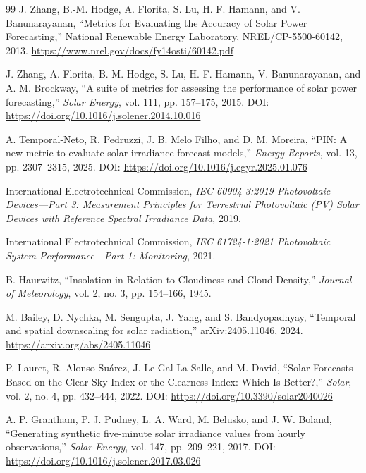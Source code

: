 \documentclass[12pt,a4paper]{article}
\begin{document}
\begin{thebibliography}{99}
J. Zhang, B.-M. Hodge, A. Florita, S. Lu, H. F. Hamann, and V. Banunarayanan,
``Metrics for Evaluating the Accuracy of Solar Power Forecasting,''
National Renewable Energy Laboratory, NREL/CP-5500-60142, 2013.
\url{https://www.nrel.gov/docs/fy14osti/60142.pdf}

J. Zhang, A. Florita, B.-M. Hodge, S. Lu, H. F. Hamann, V. Banunarayanan, and A. M. Brockway,
``A suite of metrics for assessing the performance of solar power forecasting,''
\textit{Solar Energy}, vol. 111, pp. 157--175, 2015.
DOI: \url{https://doi.org/10.1016/j.solener.2014.10.016}

A. Temporal-Neto, R. Pedruzzi, J. B. Melo Filho, and D. M. Moreira,
``PIN: A new metric to evaluate solar irradiance forecast models,''
\textit{Energy Reports}, vol. 13, pp. 2307--2315, 2025.
DOI: \url{https://doi.org/10.1016/j.egyr.2025.01.076}

International Electrotechnical Commission,
\textit{IEC 60904-3:2019 Photovoltaic Devices---Part 3: Measurement Principles for Terrestrial Photovoltaic (PV) Solar Devices with Reference Spectral Irradiance Data}, 2019.

International Electrotechnical Commission,
\textit{IEC 61724-1:2021 Photovoltaic System Performance---Part 1: Monitoring}, 2021.

B. Haurwitz,
``Insolation in Relation to Cloudiness and Cloud Density,''
\textit{Journal of Meteorology}, vol. 2, no. 3, pp. 154--166, 1945.

M. Bailey, D. Nychka, M. Sengupta, J. Yang, and S. Bandyopadhyay,
``Temporal and spatial downscaling for solar radiation,'' arXiv:2405.11046, 2024.
\url{https://arxiv.org/abs/2405.11046}

P. Lauret, R. Alonso-Suárez, J. Le Gal La Salle, and M. David,
``Solar Forecasts Based on the Clear Sky Index or the Clearness Index: Which Is Better?,''
\textit{Solar}, vol. 2, no. 4, pp. 432--444, 2022.
DOI: \url{https://doi.org/10.3390/solar2040026}

A. P. Grantham, P. J. Pudney, L. A. Ward, M. Belusko, and J. W. Boland,
``Generating synthetic five-minute solar irradiance values from hourly observations,''
\textit{Solar Energy}, vol. 147, pp. 209--221, 2017.
DOI: \url{https://doi.org/10.1016/j.solener.2017.03.026}


\end{thebibliography}
\end{document}
